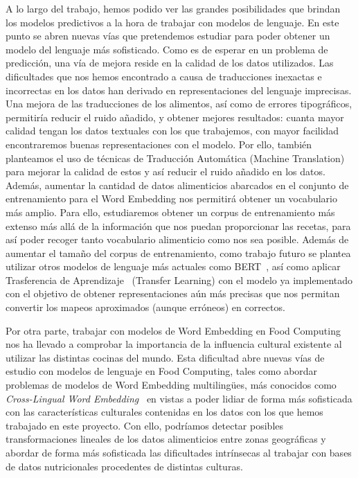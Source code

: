 A lo largo del trabajo, hemos podido ver las grandes posibilidades que brindan los modelos predictivos a la hora de trabajar con modelos de lenguaje. En este punto se abren nuevas vías que pretendemos estudiar para poder obtener un modelo del lenguaje más sofisticado. 
Como es de esperar en un problema de predicción, una vía de mejora reside en la calidad de los datos utilizados. Las dificultades que nos hemos encontrado a causa de traducciones inexactas e incorrectas en los datos han derivado en representaciones del lenguaje imprecisas. Una mejora de las traducciones de los alimentos, así como de errores tipográficos, permitiría reducir el ruido añadido, y obtener mejores resultados: cuanta mayor calidad tengan los datos textuales con los que trabajemos, con mayor facilidad encontraremos buenas representaciones con el modelo. Por ello, también planteamos el uso de técnicas de Traducción Automática (Machine Translation) para mejorar la calidad de estos y así reducir el ruido añadido en los datos. Además, aumentar la cantidad de datos alimenticios abarcados en el conjunto de entrenamiento para el Word Embedding nos permitirá obtener un vocabulario más amplio. Para ello, estudiaremos obtener un corpus de entrenamiento más extenso más allá de la información que nos puedan proporcionar las recetas, para así poder recoger tanto vocabulario alimenticio como nos sea posible. Además de aumentar el tamaño del corpus de entrenamiento, como trabajo futuro se plantea utilizar otros modelos de lenguaje más actuales como BERT~\cite{devlin2018bert}, así como aplicar Trasferencia de Aprendizaje~\cite{pan2009survey} (Transfer Learning) con el modelo ya implementado con el objetivo de obtener representaciones aún más precisas que nos permitan convertir los mapeos aproximados (aunque erróneos) en correctos.

Por otra parte, trabajar con modelos de Word Embedding en Food Computing nos ha llevado a comprobar la importancia de la influencia cultural existente al utilizar las distintas cocinas del mundo. Esta dificultad abre nuevas vías de estudio con modelos de lenguaje en Food Computing, tales como abordar problemas de modelos de Word Embedding multilingües, más conocidos como \textit{Cross-Lingual Word Embedding}~\cite{ruder2019survey} en vistas a poder lidiar de forma más sofisticada con las características culturales contenidas en los datos con los que hemos trabajado en este proyecto. Con ello, podríamos detectar posibles transformaciones lineales de los datos alimenticios entre zonas geográficas y abordar de forma más sofisticada las dificultades intrínsecas al trabajar con bases de datos nutricionales procedentes de distintas culturas.

